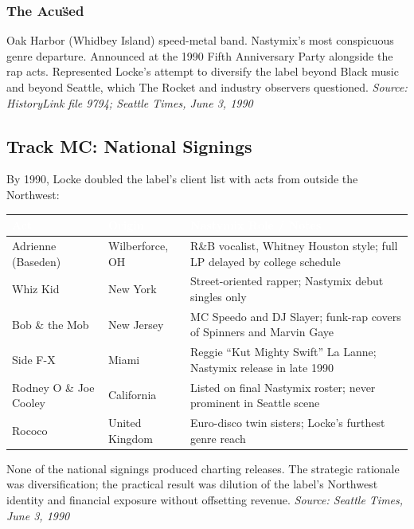 \documentclass[11pt,letterpaper]{article}
\newcommand{\tableheader}[1]{\textbf{\sffamily\textcolor{white}{#1}}}
\begin{document}
\subsubsection{The Acu\"sed}

Oak Harbor (Whidbey Island) speed-metal band. Nastymix's most conspicuous genre departure.
Announced at the 1990 Fifth Anniversary Party alongside the rap acts. Represented Locke's attempt
to diversify the label beyond Black music and beyond Seattle, which The Rocket and industry observers
questioned. \textit{Source: HistoryLink file 9794; Seattle Times, June 3, 1990}

\subsection{Track MC: National Signings}

By 1990, Locke doubled the label's client list with acts from outside the Northwest:

\begin{center}
\begin{tabularx}{\textwidth}{L{3cm}L{2.5cm}X}
\toprule
{}
\tableheader{Act} & \tableheader{Origin} & \tableheader{Nastymix Role / Notes} \\
\midrule
Adrienne (Baseden) & Wilberforce, OH & R\&B vocalist, Whitney Houston style; full LP delayed by college schedule \\
Whiz Kid & New York & Street-oriented rapper; Nastymix debut singles only \\
Bob \& the Mob & New Jersey & MC Speedo and DJ Slayer; funk-rap covers of Spinners and Marvin Gaye \\
Side F-X & Miami & Reggie ``Kut Mighty Swift'' La Lanne; Nastymix release in late 1990 \\
Rodney O \& Joe Cooley & California & Listed on final Nastymix roster; never prominent in Seattle scene \\
Rococo & United Kingdom & Euro-disco twin sisters; Locke's furthest genre reach \\
\bottomrule
\end{tabularx}
\end{center}

None of the national signings produced charting releases. The strategic rationale was diversification;
the practical result was dilution of the label's Northwest identity and financial exposure without
offsetting revenue. \textit{Source: Seattle Times, June 3, 1990}
\end{document}
